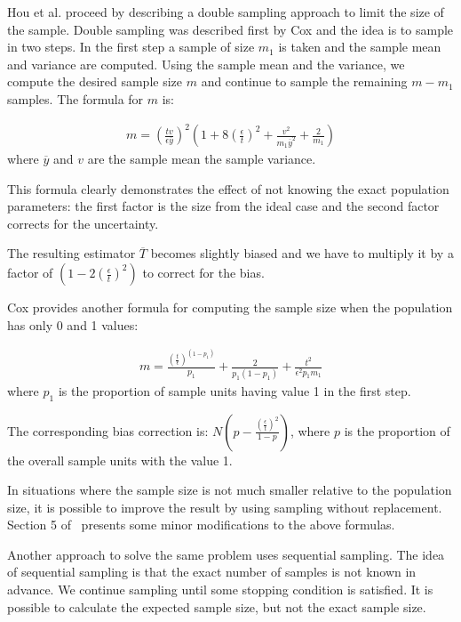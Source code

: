 \documentclass[11pt,twocolumn]{MyTightStyle}
\theoremstyle{plain}
\theoremstyle{definition}
\theoremstyle{remark}
\numberwithin{equation}{section}
\begin{document}
  Hou et al. proceed by describing a double sampling approach to limit
  the size of the sample. Double sampling was described first by Cox
  and the idea is to sample in two steps. In the first step a sample
  of size $m_1$ is taken and the sample mean and variance are
  computed. Using the sample mean and the variance, we compute the
  desired sample size $m$ and continue to sample the remaining $m-m_1$
  samples. The formula for $m$ is:

  \begin{eqnarray*}
    m = (\frac{tv}{\epsilon \overline{y}})^2(1 +
    8(\frac{\epsilon}{t})^2 + \frac{v^2}{m_1\overline{y}^2} +
    \frac{2}{m_1})
  \end{eqnarray*}
  where $\overline{y}$ and $v$ are the sample mean the sample
  variance.

  This formula clearly demonstrates the effect of not knowing the
  exact population parameters: the first factor is the size from the
  ideal case and the second factor corrects for the uncertainty.

  The resulting estimator $\overline{T}$ becomes slightly biased and we
  have to multiply it by a factor of $(1-2(\frac{\epsilon}{t})^2)$ to
  correct for the bias.

  Cox provides another formula for computing the sample size when the
  population has only 0 and 1 values:

  \begin{eqnarray*}
    m = \frac{(\frac{t}{\epsilon})^{(1-p_1)}}{p_1} + \frac{2}{p_1(1-p_1)}
    + \frac{t^2}{\epsilon^2p_1m_1}
  \end{eqnarray*}
  where $p_1$ is the proportion of sample units having value 1 in the
  first step.

  The corresponding bias correction is:
  $N(p-\frac{(\frac{\epsilon}{t})^2}{1-p})$, where $p$ is the
  proportion of the overall sample units with the value 1.

  In situations where the sample size is not much smaller relative to
  the population size, it is possible to improve the result by using
  sampling without replacement. Section 5 of~\cite{hou91error}
  presents some minor modifications to the above formulas.

  Another approach to solve the same problem uses sequential
  sampling. The idea of sequential sampling is that the exact number
  of samples is not known in advance. We continue sampling until some
  stopping condition is satisfied. It is possible to calculate the
  expected sample size, but not the exact sample size.
\end{document}
